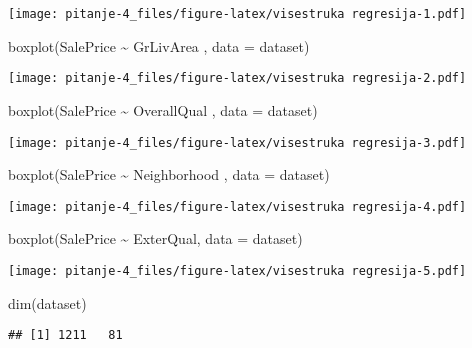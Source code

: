 \documentclass[
]{article}
\newenvironment{Shaded}{\begin{snugshade}}{\end{snugshade}}
\newcommand{\AttributeTok}[1]{\textcolor[rgb]{0.77,0.63,0.00}{#1}}
\newcommand{\FunctionTok}[1]{\textcolor[rgb]{0.00,0.00,0.00}{#1}}
\newcommand{\NormalTok}[1]{#1}
\newcommand{\SpecialCharTok}[1]{\textcolor[rgb]{0.00,0.00,0.00}{#1}}
\begin{document}
\texttt{[image: pitanje-4\_files/figure-latex/visestruka regresija-1.pdf]}

\begin{Shaded}
\begin{Highlighting}[]
\FunctionTok{boxplot}\NormalTok{(SalePrice }\SpecialCharTok{\textasciitilde{}}\NormalTok{ GrLivArea , }\AttributeTok{data =}\NormalTok{ dataset) }
\end{Highlighting}
\end{Shaded}

\texttt{[image: pitanje-4\_files/figure-latex/visestruka regresija-2.pdf]}

\begin{Shaded}
\begin{Highlighting}[]
\FunctionTok{boxplot}\NormalTok{(SalePrice }\SpecialCharTok{\textasciitilde{}}\NormalTok{ OverallQual , }\AttributeTok{data =}\NormalTok{ dataset) }
\end{Highlighting}
\end{Shaded}

\texttt{[image: pitanje-4\_files/figure-latex/visestruka regresija-3.pdf]}

\begin{Shaded}
\begin{Highlighting}[]
\FunctionTok{boxplot}\NormalTok{(SalePrice }\SpecialCharTok{\textasciitilde{}}\NormalTok{ Neighborhood , }\AttributeTok{data =}\NormalTok{ dataset) }
\end{Highlighting}
\end{Shaded}

\texttt{[image: pitanje-4\_files/figure-latex/visestruka regresija-4.pdf]}

\begin{Shaded}
\begin{Highlighting}[]
\FunctionTok{boxplot}\NormalTok{(SalePrice }\SpecialCharTok{\textasciitilde{}}\NormalTok{ ExterQual, }\AttributeTok{data =}\NormalTok{ dataset) }
\end{Highlighting}
\end{Shaded}

\texttt{[image: pitanje-4\_files/figure-latex/visestruka regresija-5.pdf]}

\begin{Shaded}
\begin{Highlighting}[]
\FunctionTok{dim}\NormalTok{(dataset)}
\end{Highlighting}
\end{Shaded}

\begin{verbatim}
## [1] 1211   81
\end{verbatim}
\end{document}
